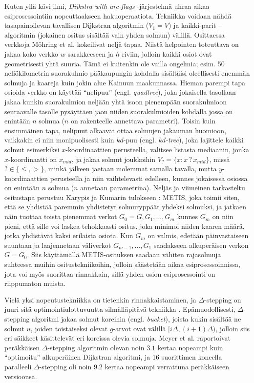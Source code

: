 \documentclass[12pt]{article}
\begin{document}
Kuten yllä kävi ilmi, \textit{Dijkstra with arc-flags} -järjestelmä uhraa aikaa esiprosessointiin nopeuttaakseen hakuoperaatiota. Tekniikka voidaan nähdä tasapainoilevan tavallisen Dijkstran algoritmin ($V_1 = V$) ja kaikki-parit --algoritmin (jokainen ositus sisältää vain yhden solmun) välillä. Osittaessa verkkoja Möhring et al. kokeilivat neljä tapaa. Niistä helpointen toteuttava on jakaa koko verkko $w$ sarakkeeseen ja $h$ riviin, jolloin kaikki osiot ovat geometrisesti yhtä suuria. Tämä ei kuitenkin ole vailla ongelmia; esim. 50 neliökilometrin suorakulmio pääkaupungin kohdalla sisältäisi oleellisesti enemmän solmuja ja kaareja kuin jokin alue Kainuun maakunnassa. Hieman parempi tapa osioida verkko on käyttää ``nelipuu'' (engl. \textit{quadtree}), joka jokaisella tasollaan jakaa kunkin suorakulmion neljään yhtä isoon pienempään suorakulmioon seuraavalle tasolle pysäyttäen jaon niiden suorakulmioiden kohdalla jossa on enintään $n$ solmua ($n$ on rakenteelle annettava parametri). Toisin kuin ensimmäinen tapa, nelipuut alkaavat ottaa solmujen jakauman huomioon, vaikkakin ei niin monipuolisesti kuin $kd$-puu (engl. \textit{$kd$-tree}), joka lajittele kaikki solmut esimerkiksi $x$-koordinaattien perusteella, valitsee listasta mediaanin, jonka $x$-koordinaatti on $x_{mid}$, ja jakaa solmut joukkoihin $V_? = \{ x \colon x \, ? \, x_{mid} \}$, missä $? \in \{ \leq, >\}$, minkä jälkeen jaetaan molemmat samalla tavalla, mutta $y$-koordinaattien perusteella ja niin vaihtelevasti edelleen, kunnes jokaisessa osiossa on enintään $n$ solmua ($n$ annetaan parametrina). Neljäs ja viimeinen tarkasteltu ositustapa perustuu Karypis ja Kumarin tulokseen \cite{Karypis98}: METIS, joka toimii siten, että se yhdistää paremmin yhdistetyt solmuryppäät yhdeksi solmuksi, ja jatkaen näin tuottaa toista pienemmät verkot $G_0 = G, G_1, \dots, G_m$ kunnes $G_m$ on niin pieni, että sille voi laskea tehokkaasti ositus, joka minimoi niiden kaaren määrä, jotka yhdistävät kaksi erilaista osiota. Kun $G_m$ on valmis, edetään päinvastaiseen suuntaan ja laajennetaan väliverkot $G_{m - 1}, \dots, G_1$ saadakseen alkuperäisen verkon $G = G_0$. Siis käyttämällä METIS-osituksen saadaan vähiten rajasolmuja suhteessa muihin ositustekniikoihin, jolloin säästetään aikaa esiprosessoinnissa, jota voi myös suorittaa rinnakkain, sillä yhden osion esiprosessointi on riippumaton muista.

Vielä yksi nopeutustekniikka on tietenkin rinnakkaistaminen, ja $\Delta$-stepping on juuri sitä optimointiulottuvuutta silmälläpitävä tekniikka \cite{Meyer98}. Epämuodollisesti, $\Delta$-stepping algoritmi jakaa solmut koreihin (engl. \textit{bucket}), joista kukin sisältää ne solmut $u$, joiden toistaiseksi olevat $g$-arvot ovat välillä $[i\Delta, (i +1)\Delta)$, jolloin siis eri säikkeet käsittelevät eri koreissa olevia solmuja. Meyer et al. raportoivat peräkkäisen $\Delta$-stepping algoritmin olevan noin $3.1$ kertaa nopeampi kuin ``optimoitu'' alkuperäinen Dijkstran algoritmi, ja 16 suorittimen koneella paralleeli $\Delta$-stepping oli noin $9.2$ kertaa nopeampi verrattuna peräkkäiseen versioonsa.


\end{document}
